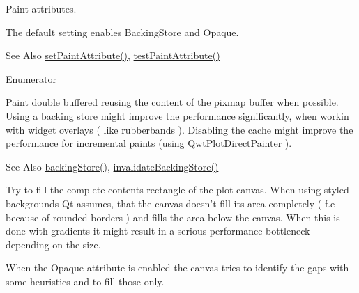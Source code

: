 Paint attributes. 

The default setting enables Backing\-Store and Opaque.

\begin{DoxySeeAlso}{See Also}
\hyperlink{class_qwt_plot_canvas_a7859beb87bcef4fd53f99e7c87104e27}{set\-Paint\-Attribute()}, \hyperlink{class_qwt_plot_canvas_a804f78518b0ba72b11ba996fd2457fb1}{test\-Paint\-Attribute()} 
\end{DoxySeeAlso}
\begin{Desc}
\item[Enumerator]\par
\begin{description}
\item[{\em 
\hypertarget{class_qwt_plot_canvas_a76066290edb594a71ee09be564563b0fa7b88a46e1414f6d904aa494c89d064f3}{Backing\-Store}\label{class_qwt_plot_canvas_a76066290edb594a71ee09be564563b0fa7b88a46e1414f6d904aa494c89d064f3}
}]Paint double buffered reusing the content of the pixmap buffer when possible. Using a backing store might improve the performance significantly, when workin with widget overlays ( like rubberbands ). Disabling the cache might improve the performance for incremental paints (using \hyperlink{class_qwt_plot_direct_painter}{Qwt\-Plot\-Direct\-Painter} ).

\begin{DoxySeeAlso}{See Also}
\hyperlink{class_qwt_plot_canvas_aa46dfe9b0d4a3a1d81ef1fca66c2093c}{backing\-Store()}, \hyperlink{class_qwt_plot_canvas_adafbfa908b2d3b6cf9c20aa6cf9abe27}{invalidate\-Backing\-Store()} 
\end{DoxySeeAlso}
\item[{\em 
\hypertarget{class_qwt_plot_canvas_a76066290edb594a71ee09be564563b0fa1d10fbb2b1fc3323e8597597684b1f9f}{Opaque}\label{class_qwt_plot_canvas_a76066290edb594a71ee09be564563b0fa1d10fbb2b1fc3323e8597597684b1f9f}
}]Try to fill the complete contents rectangle of the plot canvas. When using styled backgrounds Qt assumes, that the canvas doesn't fill its area completely ( f.\-e because of rounded borders ) and fills the area below the canvas. When this is done with gradients it might result in a serious performance bottleneck -\/ depending on the size.

When the Opaque attribute is enabled the canvas tries to identify the gaps with some heuristics and to fill those only.


\end{description}
\end{Desc}
